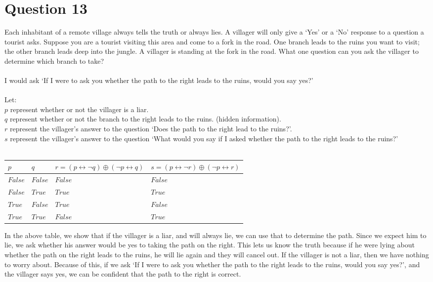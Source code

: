 \documentclass[12pt]{extarticle}
\begin{document}
\section*{Question 13}
	Each inhabitant of a remote village always tells the truth or always lies. A villager will only give a `Yes' or a `No' response to a question a tourist asks. Suppose you are a tourist visiting this area and come to a fork in the road. One branch leads to the ruins you want to visit; the other branch leads deep into the jungle. A villager is standing at the fork in the road. What one question can you ask the villager to determine which branch to take?\\\\
	I would ask `If I were to ask you whether the path to the right leads to the ruins, would you say yes?'\\\\
	Let:\\
		\hspace*{1cm}$p$ represent whether or not the villager is a liar.\\
		\hspace*{1cm}$q$ represent whether or not the branch to the right leads to the ruins. (hidden information).\\
		\hspace*{1cm}$r$ represent the villager's answer to the question `Does the path to the right lead to the ruins?'.\\
		\hspace*{1cm}$s$ represent the villager's answer to the question `What would you say if I asked whether the path to the right leads to the ruins?'\\ \\
	\begin{center}
		\begin{tabular}{ | p{2cm} | p{2cm} | p{5cm} | p{5cm} |}
			\hline$p$ & $q$ & $r = (p \leftrightarrow \neg q) \oplus (\neg p \leftrightarrow q)$ & $s = (p \leftrightarrow \neg r) \oplus (\neg p \leftrightarrow  r)$ \\ \hline \hline
			$False$ & $False$ & $False$ & $False$\\ \hline 
			$False$ & $True$ & $True$ & $True$\\ \hline
			$True$ & $False$ & $True$ & $False$\\ \hline
			$True$ & $True$ & $False$ & $True$\\ \hline
		\end{tabular}
	\end{center}
	In the above table, we show that if the villager is a liar, and will always lie, we can use that to determine the path.  Since we expect him to lie, we ask whether his answer would be yes to taking the path on the right.  This lets us know the truth because if he were lying about whether the path on the right leads to the ruins, he will lie again and they will cancel out.  If the villager is not a liar, then we have nothing to worry about.  Because of this, if we ask `If I were to ask you whether the path to the right leads to the ruins, would you say yes?', and the villager says yes, we can be confident that the path to the right is correct.
\end{document}
